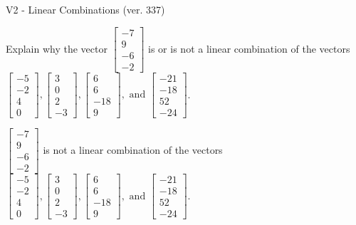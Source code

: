 \begin{exercise}
  \begin{exerciseTitle}V2 - Linear Combinations (ver. 337)\end{exerciseTitle}
  \begin{exerciseStatement}
    Explain why the vector \(\left[\begin{array}{c}
-7 \\
9 \\
-6 \\
-2
\end{array}\right]\)  is or is not a linear 
	combination of the vectors \(\left[\begin{array}{c}
-5 \\
-2 \\
4 \\
0
\end{array}\right] , \left[\begin{array}{c}
3 \\
0 \\
2 \\
-3
\end{array}\right] , \left[\begin{array}{c}
6 \\
6 \\
-18 \\
9
\end{array}\right] , \text{ and } \left[\begin{array}{c}
-21 \\
-18 \\
52 \\
-24
\end{array}\right]\).
	


  \end{exerciseStatement}
  \begin{exerciseAnswer}
   \(\left[\begin{array}{c}
-7 \\
9 \\
-6 \\
-2
\end{array}\right]\) 
  	 is not  
	a linear combination of the vectors \(\left[\begin{array}{c}
-5 \\
-2 \\
4 \\
0
\end{array}\right] , \left[\begin{array}{c}
3 \\
0 \\
2 \\
-3
\end{array}\right] , \left[\begin{array}{c}
6 \\
6 \\
-18 \\
9
\end{array}\right] , \text{ and } \left[\begin{array}{c}
-21 \\
-18 \\
52 \\
-24
\end{array}\right]\).


\end{exerciseAnswer}
\end{exercise}
